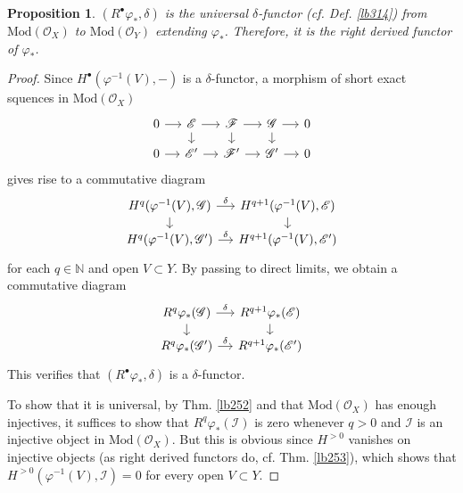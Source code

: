 \documentclass[12pt,b5paper,notitlepage]{report}
\theoremstyle{definition}
\theoremstyle{plain}
\newtheorem{pp}[df]{Proposition}
\newcommand{\scr}{\mathscr}
\newcommand{\blt}{\bullet}
\newcommand{\Nbb}{\mathbb N}
\newcommand{\Mod}{\mathrm{Mod}}
\numberwithin{equation}{section}
\begin{document}
\begin{pp}
$(R^\blt\varphi_*,\delta)$ is the universal $\delta$-functor (cf. Def. \ref{lb314}) from $\Mod(\scr O_X)$ to $\Mod(\scr O_Y)$ extending $\varphi_*$. Therefore, it is the right derived functor of $\varphi_*$.
\end{pp}


\begin{proof}
Since $H^\blt(\varphi^{-1}(V),-)$ is a $\delta$-functor, a morphism of short exact squences in $\Mod(\scr O_X)$
\begin{equation}\label{eq140}
\begin{tikzcd}[sep=small]
0 \arrow[r] & \scr E \arrow[r] \arrow[d] & \scr F \arrow[r] \arrow[d] & \scr G \arrow[r] \arrow[d] & 0 \\
0 \arrow[r] & \scr E' \arrow[r]          & \scr F' \arrow[r]          & \scr G' \arrow[r]          & 0
\end{tikzcd}
\end{equation}
gives rise to a commutative diagram
\begin{equation*}
\begin{tikzcd}[sep=small]
H^q(\varphi^{-1}(V),\scr G) \arrow[r,"\delta"] \arrow[d] & H^{q+1}(\varphi^{-1}(V),\scr E) \arrow[d] \\
H^q(\varphi^{-1}(V),\scr G')\arrow[r,"\delta"]           & H^{q+1}(\varphi^{-1}(V),\scr E')         
\end{tikzcd}
\end{equation*}
for each $q\in\Nbb$ and open $V\subset Y$. By passing to direct limits, we obtain a commutative diagram
\begin{equation*}
\begin{tikzcd}[sep=small]
R^q\varphi_*(\scr G) \arrow[r,"\delta"] \arrow[d] & R^{q+1}\varphi_*(\scr E) \arrow[d] \\
R^q\varphi_*(\scr G')\arrow[r,"\delta"]           & R^{q+1}\varphi_*(\scr E')
\end{tikzcd}
\end{equation*}
This verifies that $(R^\blt\varphi_*,\delta)$ is a $\delta$-functor. 

To show that it is universal, by Thm. \ref{lb252} and that $\Mod(\scr O_X)$ has enough injectives, it suffices to show that $R^q\varphi_*(\scr I)$ is zero whenever $q>0$ and $\scr I$ is an injective object in $\Mod(\scr O_X)$. But this is obvious since $H^{>0}$ vanishes on injective objects (as right derived functors do, cf. Thm. \ref{lb253}), which shows that $H^{>0}(\varphi^{-1}(V),\scr I)=0$ for every open $V\subset Y$.
\end{proof}
\end{document}
